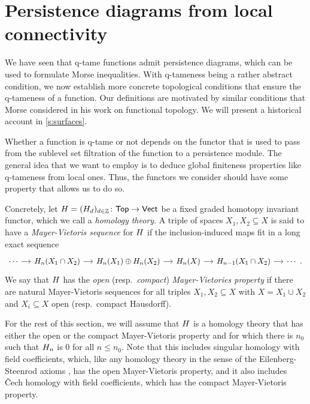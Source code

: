 
\section{Persistence diagrams from local connectivity} \label{s:connectivity}

We have seen that q-tame functions admit persistence diagrams, which can be used to formulate Morse inequalities.
With q-tameness being a rather abstract condition, we now establish more concrete topological conditions that ensure the q-tameness of a function.
Our definitions are motivated by similar conditions that Morse considered in his work on functional topology.
We will present a historical account in \cref{s:surfaces}.

Whether a function is q-tame or not depends on the functor that is used to pass from the sublevel set filtration of the function to a persistence module.
The general idea that we want to employ is to deduce global finiteness properties like q-tameness from local ones.
Thus, the functors we consider should have some property that allows us to do so.

Concretely, let $H = (H_d)_{d \in \mathbb{Z}} \colon \mathsf{Top} \to \mathsf{Vect}$ be a fixed graded homotopy invariant functor, which we call a \emph{homology theory}.
A triple of spaces $X_{1}, X_{2} \subseteq X$ is said to have a \emph{Mayer-Vietoris sequence} for $H$ if the inclusion-induced maps fit in a long exact sequence
\begin{equation*}
\begin{tikzcd}[column sep = small]
\cdots \arrow[r] & \H_{n}(X_{1} \cap X_{2}) \arrow[r] & \H_{n}(X_{1}) \oplus \H_{n}(X_{2}) \arrow[r] & \H_{n}(X) \arrow[r] & \H_{n-1}(X_{1} \cap X_{2}) \arrow[r] & \cdots \ .
\end{tikzcd}
\end{equation*}
We say that $H$ has the \emph{open} (resp.\@\  \emph{compact}) \emph{Mayer-Vietories property} if there are natural Mayer-Vietoris sequences for all triples $X_{1}, X_{2} \subseteq X$ with $X = X_1 \cup X_2$ and $X_i \subseteq X$ open (resp.\@\ compact Hausdorff).

For the rest of this section, we will assume that $H$ is a homology theory that has either the open or the compact Mayer-Vietoris property and for which there is $n_0$ such that $H_{n}$ is 0 for all $n \leq n_0$.
Note that this includes singular homology with field coefficients, which, like any homology theory in the sense of the Eilenberg-Steenrod axioms \cite[Section I]{MR0050886}, has the open Mayer-Vietoris property, and it also includes \v{C}ech homology with field coefficients, which has the compact Mayer-Vietoris property.

